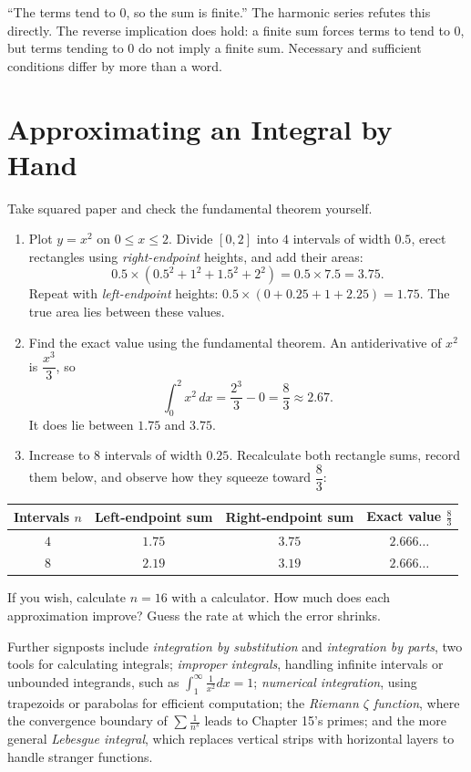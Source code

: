 \begin{fanli}
``The terms tend to $0$, so the sum is finite.'' The harmonic series refutes this directly. The reverse implication does hold: a finite sum forces terms to tend to $0$, but terms tending to $0$ do not imply a finite sum. Necessary and sufficient conditions differ by more than a word.
\end{fanli}

\section{Approximating an Integral by Hand}

\begin{shiyan}
Take squared paper and check the fundamental theorem yourself.

\begin{enumerate}
  \item Plot $y=x^{2}$ on $0\le x\le 2$. Divide $[0,2]$ into $4$ intervals of width $0.5$, erect rectangles using \emph{right-endpoint} heights, and add their areas:
  \[
  0.5\times(0.5^{2}+1^{2}+1.5^{2}+2^{2})=0.5\times 7.5=3.75 .
  \]
  Repeat with \emph{left-endpoint} heights: $0.5\times(0+0.25+1+2.25)=1.75$. The true area lies between these values.
  \item Find the exact value using the fundamental theorem. An antiderivative of $x^{2}$ is $\dfrac{x^{3}}{3}$, so
  \[
  \int_0^2 x^{2}\,dx=\frac{2^{3}}{3}-0=\frac83\approx 2.67 .
  \]
  It does lie between $1.75$ and $3.75$.
  \item Increase to $8$ intervals of width $0.25$. Recalculate both rectangle sums, record them below, and observe how they squeeze toward $\dfrac83$:
\end{enumerate}
\begin{center}
\begin{tabular}{cccc}
\toprule
Intervals $n$ & Left-endpoint sum & Right-endpoint sum & Exact value $\frac83$ \\
\midrule
$4$ & $1.75$ & $3.75$ & $2.666\ldots$ \\
$8$ & $2.19$ & $3.19$ & $2.666\ldots$ \\
\bottomrule
\end{tabular}
\end{center}
If you wish, calculate $n=16$ with a calculator. How much does each approximation improve? Guess the rate at which the error shrinks.
\end{shiyan}

\begin{pandeng}
Further signposts include \emph{integration by substitution} and \emph{integration by parts}, two tools for calculating integrals; \emph{improper integrals}, handling infinite intervals or unbounded integrands, such as $\int_1^{\infty}\frac{1}{x^{2}}dx=1$; \emph{numerical integration}, using trapezoids or parabolas for efficient computation; the \emph{Riemann $\zeta$ function}, where the convergence boundary of $\sum\frac{1}{n^{s}}$ leads to Chapter 15's primes; and the more general \emph{Lebesgue integral}, which replaces vertical strips with horizontal layers to handle stranger functions.
\end{pandeng}

